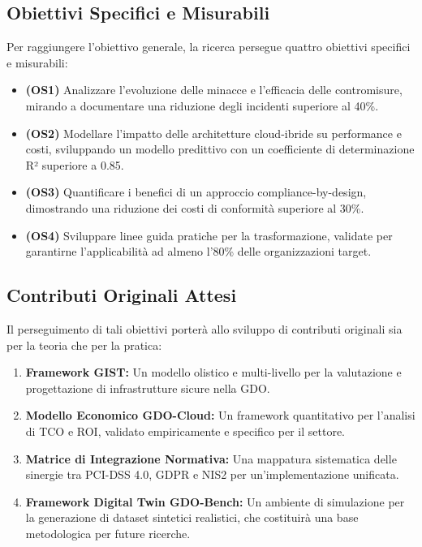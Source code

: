 \subsection{Obiettivi Specifici e Misurabili}
Per raggiungere l'obiettivo generale, la ricerca persegue quattro obiettivi specifici e misurabili:
\begin{itemize}
    \item \textbf{(OS1)} Analizzare l'evoluzione delle minacce e l'efficacia delle contromisure, mirando a documentare una riduzione degli incidenti superiore al 40\%.
    \item \textbf{(OS2)} Modellare l'impatto delle architetture cloud-ibride su performance e costi, sviluppando un modello predittivo con un coefficiente di determinazione R² superiore a 0.85.
    \item \textbf{(OS3)} Quantificare i benefici di un approccio compliance-by-design, dimostrando una riduzione dei costi di conformità superiore al 30\%.
    \item \textbf{(OS4)} Sviluppare linee guida pratiche per la trasformazione, validate per garantirne l'applicabilità ad almeno l'80\% delle organizzazioni target.
\end{itemize}

\subsection{Contributi Originali Attesi}
Il perseguimento di tali obiettivi porterà allo sviluppo di contributi originali sia per la teoria che per la pratica:
\begin{enumerate}
    \item \textbf{Framework GIST:} Un modello olistico e multi-livello per la valutazione e progettazione di infrastrutture sicure nella GDO.
    \item \textbf{Modello Economico GDO-Cloud:} Un framework quantitativo per l'analisi di TCO e ROI, validato empiricamente e specifico per il settore.
    \item \textbf{Matrice di Integrazione Normativa:} Una mappatura sistematica delle sinergie tra PCI-DSS 4.0, GDPR e NIS2 per un'implementazione unificata.
    \item \textbf{Framework Digital Twin GDO-Bench:} Un ambiente di simulazione per la generazione di dataset sintetici realistici, che costituirà una base metodologica per future ricerche.
\end{enumerate}

